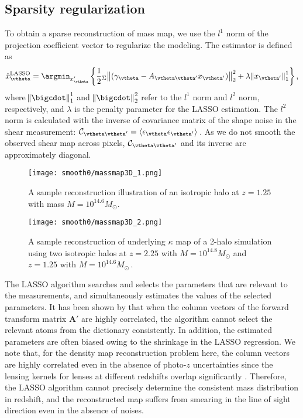 \documentclass[twocolumn, usenames, dvipsnames]{aastex63}
\begin{document}
\subsection{Sparsity regularization}
\label{sec:massmap_reg}

To obtain a sparse reconstruction of mass map, we use the  $l^1$ norm of the
projection coefficient vector to regularize the modeling. The estimator is
defined as
\begin{equation}
\label{eq:lasso}
\hat{x}_{\vtheta}^{\rm{LASSO}}=\argmin_{x_\vtheta'} \left\{
\frac{1}{2} {}_\Sigma\norm{(\gamma_\vtheta - A_{\vtheta \vtheta'} x_{\vtheta'} )}_2^2+
    \lambda \norm{x_{\vtheta'}}^1_1\right\},
\end{equation}
where $\norm{\bigcdot}_1^1$ and $\norm{\bigcdot}_2^2$ refer to the $l^1$ norm
and $l^2$ norm, respectively, and $\lambda$ is the penalty parameter for the
LASSO estimation. The $l^2$ norm is calculated with the inverse of covariance
matrix of the shape noise in the shear measurement:
$\mathcal{C}_{\vtheta\vtheta'}=\langle
\epsilon_{\vtheta}\epsilon_{\vtheta'}\rangle\,$.
As we do not smooth the observed shear map across pixels,
$\mathcal{C}_{\vtheta\vtheta'}$ and its inverse are approximately diagonal.

\begin{figure}
\centering
\texttt{[image: smooth0/massmap3D\_1.png]}
\caption{
    A sample reconstruction illustration of an isotropic halo at $z=1.25$ with
    mass $M = 10^{14.6}M_{\odot}$.
    }
    \label{fig:sample_1halo}
\end{figure}

\begin{figure}
\centering
\texttt{[image: smooth0/massmap3D\_2.png]}
\caption{
    A sample reconstruction of underlying $\kappa$ map of a 2-halo simulation
    using two isotropic halos at $z=2.25$ with $M = 10^{14.8}M_{\odot}$ and
    $z=1.25$ with $M = 10^{14.6}M_{\odot}$\,.
    }
    \label{fig:sample_2halo}
\end{figure}

The LASSO algorithm searches and selects the parameters that are relevant to
the measurements, and simultaneously estimates the values of the selected
parameters. It has been shown by \citet{AdaLASSO-Zou2006} that when the column
vectors of the forward transform matrix $\mathbf{A'}$ are highly correlated,
the algorithm cannot select the relevant atoms from the dictionary
consistently. In addition, the estimated parameters are often biased owing to
the shrinkage in the LASSO regression. We note that, for the density map
reconstruction problem here, the column vectors are highly correlated even in
the absence of photo-$z$ uncertainties since the lensing kernels for lenses at
different redshifts overlap significantly \citep{massmap_Li2021}. Therefore,
the LASSO algorithm cannot precisely determine the consistent mass distribution
in redshift, and the reconstructed map suffers from smearing in the line of
sight direction even in the absence of noises.
\end{document}
